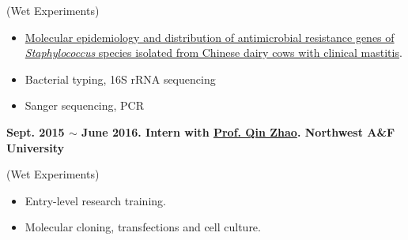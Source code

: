 (Wet Experiments)

\begin{itemize}
    \item \href{https://scholar.google.com/citations?view_op=view_citation&hl=zh-CN&user=ojSVoWQAAAAJ&citation_for_view=ojSVoWQAAAAJ:UeHWp8X0CEIC}
    {Molecular epidemiology and distribution of antimicrobial resistance genes of \textit{Staphylococcus} species isolated from Chinese dairy cows with clinical mastitis}\cite{qu2019molecular}.
    \item Bacterial typing, 16S rRNA sequencing
    \item Sanger sequencing, PCR
\end{itemize}


\textbf{
    Sept. 2015 $\sim$ June 2016. Intern with \href{https://dyxy.nwsuaf.edu.cn/en/People/FullProfessor/5e6012bf013a499c946289472b285795.htm}{Prof. Qin Zhao}. Northwest A\&F University
}

(Wet Experiments)


\begin{itemize}
    \item Entry-level research training.
    \item Molecular cloning, transfections and cell culture.
\end{itemize}